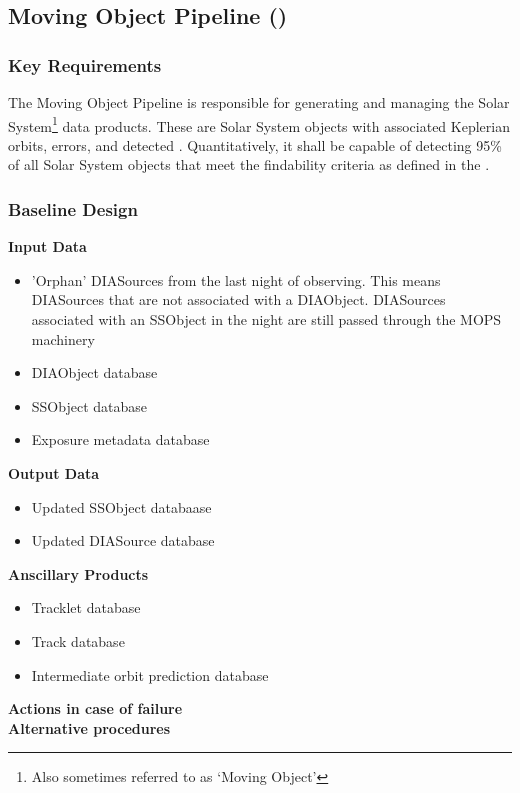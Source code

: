 \subsection{Moving Object Pipeline (\wbsMOPS)}

\subsubsection{Key Requirements}

The Moving Object Pipeline is responsible for generating and managing the Solar System\footnote{Also sometimes referred to as `Moving Object'} data products. These are Solar System objects with associated Keplerian orbits, errors, and detected \DIASources. Quantitatively, it shall be capable of detecting 95\% of all Solar System objects that meet the findability criteria as defined in the \OSS\@. 

\subsubsection{Baseline Design}
{\bf Input Data}\\
\begin{itemize}
\item 'Orphan' DIASources from the last night of observing.  This means DIASources that are not associated with a DIAObject.  DIASources associated with an SSObject in the night are still passed through the MOPS machinery
\item DIAObject database
\item SSObject database
\item Exposure metadata database
\end{itemize}
{\bf Output Data}\\
\begin{itemize}
\item Updated SSObject databaase
\item Updated DIASource database
\end{itemize}
{\bf Anscillary Products}\\
\begin{itemize}
\item Tracklet database
\item Track database
\item Intermediate orbit prediction database
\end{itemize}
{\bf Actions in case of failure}\\
{\bf Alternative procedures}\\

